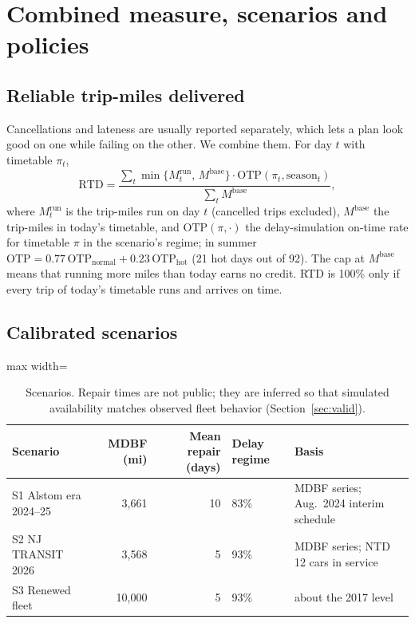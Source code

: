 \documentclass[11pt]{article}
\begin{document}
\section{Combined measure, scenarios and policies}\label{sec:rtd}
\subsection{Reliable trip-miles delivered}
Cancellations and lateness are usually reported separately, which lets a plan look good on one while failing on the other. We combine them. For day $t$ with timetable $\pi_t$,
\begin{equation}\label{eq:rtd}
\mathrm{RTD}=\frac{\sum_t \min\{M^{\text{run}}_t,\,M^{\text{base}}\}\cdot \mathrm{OTP}(\pi_t,\text{season}_t)}{\sum_t M^{\text{base}}},
\end{equation}
where $M^{\text{run}}_t$ is the trip-miles run on day $t$ (cancelled trips excluded), $M^{\text{base}}$ the trip-miles in today's timetable, and $\mathrm{OTP}(\pi,\cdot)$ the delay-simulation on-time rate for timetable $\pi$ in the scenario's regime; in summer $\mathrm{OTP}=0.77\,\mathrm{OTP}_{\text{normal}}+0.23\,\mathrm{OTP}_{\text{hot}}$ (21 hot days out of 92). The cap at $M^{\text{base}}$ means that running more miles than today earns no credit. RTD is 100\% only if every trip of today's timetable runs and arrives on time.

\subsection{Calibrated scenarios}\label{sec:calibinputs}
\begin{table}[ht]\centering\small
\begin{adjustbox}{max width=\linewidth}
\begin{tabular}{@{}lrrll@{}}
\toprule
Scenario & MDBF (mi) & Mean repair (days) & Delay regime & Basis \\ \midrule
S1 Alstom era 2024--25 & 3{,}661 & 10 & 83\% & MDBF series; Aug.~2024 interim schedule \\
S2 NJ TRANSIT 2026 & 3{,}568 & 5 & 93\% & MDBF series; NTD 12 cars in service \\
S3 Renewed fleet & 10{,}000 & 5 & 93\% & about the 2017 level \\
\bottomrule
\end{tabular}
\end{adjustbox}
\caption{Scenarios. Repair times are not public; they are inferred so that simulated availability matches observed fleet behavior (Section~\ref{sec:valid}).}\label{tab:scen}
\end{table}
\end{document}
